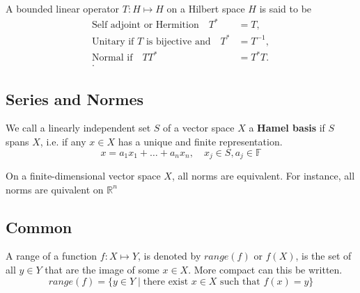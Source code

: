 \documentclass{article}
\theoremstyle{remark}
\begin{document}
\begin{definition}
  A bounded linear operator $T: H \mapsto H$ on a Hilbert space $H$ is said to be 
  \begin{align*}
    \text{Self adjoint or Hermition} \quad T^{*} &= T ,\\
    \text{Unitary if $T$ is bijective and} \quad T^{*} &= T^{-1} ,\\
    \text{Normal if} \quad TT^{*} &= T^{*}T. \\ 
  .\end{align*}
  
\end{definition}


\subsection{Series and Normes}%
\label{sub:series_and_normes}

\begin{definition}
  We call a linearly independent set $S$ of a vector space $X$ a \textbf{Hamel basis} if $S$ spans $X$, i.e. if any $x \in X$ has a unique and finite representation. \[
  x  = a_1 x_1 + \ldots + a_{n} x_{n}, \quad x_{j} \in S, a_{j} \in \mathbb{F} 
  \] 
  
\end{definition}

\begin{theorem}
  On a finite-dimensional vector space $X$, all norms are equivalent. For instance, all norms are quivalent on $\mathbb{R}^{n}$
\end{theorem}


\subsection{Common}%
\label{sub:common}

\begin{definition}[Range]
  A range of a function $f: X \mapsto Y$, is denoted by $range\left( f \right) $ or $f\left( X \right) $, is the set of all $y \in Y$ that are the image of some $x \in X$. More compact can this be written. \[
    range\left( f \right) = \{y \in Y  \mid \text{there exist } x \in X \text{ such that } f\left( x \right) = y\} 
  \] 
\end{definition}
\end{document}
